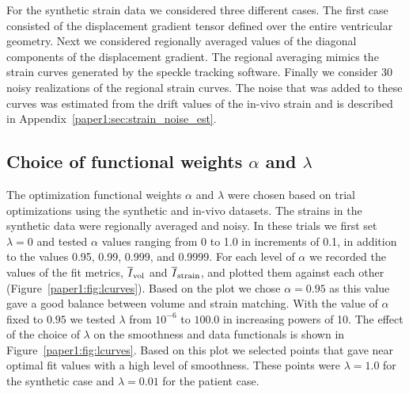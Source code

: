 For the synthetic strain data we considered three different cases. The
first case consisted of the displacement  
gradient tensor defined over the entire ventricular geometry. Next we
considered regionally averaged values of the 
diagonal components of the displacement gradient. The regional averaging mimics the
strain curves generated by the speckle tracking software.  
Finally we consider 30 noisy realizations of the regional strain
curves. The noise that was added to these curves was estimated 
from the drift values of the in-vivo strain and is described in
Appendix~\ref{paper1:sec:strain_noise_est}.


\subsection{Choice of functional weights $\alpha$ and $\lambda$}
\label{paper1:sec:a_l_choice}
The optimization functional weights $\alpha$ and $\lambda$ were chosen based on
trial optimizations using the synthetic and in-vivo datasets. The strains in the synthetic
data were regionally averaged and noisy.
In these trials we first set $\lambda = 0$ and tested $\alpha$ values
ranging from 0 to 1.0 in increments of 0.1, in addition to the values
0.95, 0.99, 0.999, and 0.9999.
For each level of $\alpha$ we recorded the values of the
fit metrics, $\overline{I}_{\text{vol}}$ 
and $\overline{I}_{\text{strain}}$, and plotted them against each
other (Figure~\ref{paper1:fig:lcurves}). Based on the plot 
we chose $\alpha = 0.95$ as this value gave a good balance between
volume and strain matching.  
With the value of $\alpha$ fixed to $0.95$ we tested $\lambda$
from $10^{-6}$ to $100.0$ in increasing powers of 10.
The effect of the choice of $\lambda$ on the smoothness and data functionals
is shown in Figure~\ref{paper1:fig:lcurves}. Based on this plot we selected points
that gave near optimal fit values with a high level of smoothness. 
These points were $\lambda = 1.0$ for the synthetic case
and $\lambda = 0.01$ for the patient case.



